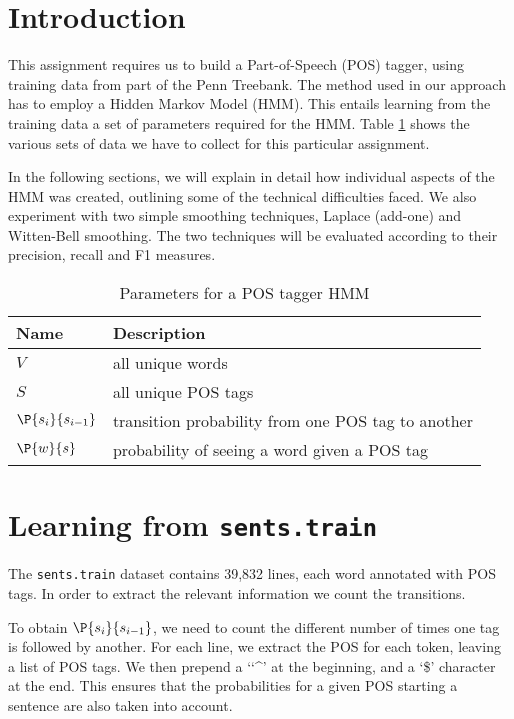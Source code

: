 \documentclass[12pt]{homework}
\title{}
\author{}
\date{}
\newcommand{\transprob}{\P{s_i}{s_{i-1}}}
\newcommand{\obsprob}{\P{w}{s}}
\begin{document}
\maketitle
{}
\section{Introduction}

This assignment requires us to build a Part-of-Speech (POS) tagger, using 
training data from part of the Penn Treebank. The method used in our approach 
has to employ a Hidden Markov Model (HMM). This entails learning from the 
training data a set of parameters required for the HMM. Table \ref{parameters} 
shows the various sets of data we have to collect for this particular 
assignment.

In the following sections, we will explain in detail how individual aspects of 
the HMM was created, outlining some of the technical difficulties faced. We also  
experiment with two simple smoothing techniques, Laplace (add-one) and 
Witten-Bell smoothing. The two techniques will be evaluated according to their 
precision, recall and F1 measures.

\begin{table}
	\begin{center}
	\begin{tabular}{l l}
		\hline
		Name			&	Description\\
		\hline
		$V$				&	all unique words\\
		$S$				&	all unique POS tags\\
		$\transprob$	&	transition probability from one POS tag to another\\
		$\obsprob$		&	probability of seeing a word given a POS tag\\
		\hline
	\end{tabular}
	\end{center}
	\label{parameters}\caption{Parameters for a POS tagger HMM}
\end{table}
\section{Learning from \texttt{sents.train}}
The \texttt{sents.train} dataset contains 39,832 lines, each word annotated with 
POS tags. In order to extract the relevant information we count the transitions.

To obtain $\transprob$, we need to count the different number of times one tag 
is followed by another. For each line, we extract the POS for each token, 
leaving a list of POS tags. We then prepend a `{\char`\^}' at the beginning, and 
a `\$' character at the end. This ensures that the probabilities for a given POS 
starting a sentence are also taken into account.
\end{document}

